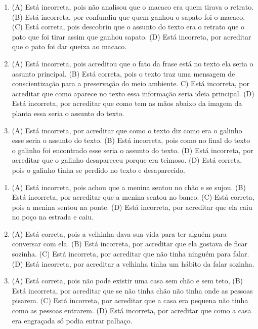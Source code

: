 
\begin{enumerate}
\item
(A) Está incorreta, pois não analisou que o macaco era quem tirava o retrato.
(B) Está incorreta, por confundiu que quem ganhou o sapato foi o macaco.
(C) Está correta, pois descobriu que o assunto do texto era o retrato
que o pato que foi tirar assim que ganhou sapato.
(D) Está incorreta, por acreditar que o pato foi dar queixa ao macaco.

\item
(A) Está incorreta, pois acreditou que o fato da frase está no texto ela
seria o assunto principal.
(B) Está correta, pois o texto traz uma mensagem de conscientização para
a preservação do meio ambiente.
C) Está incorreta, por acreditar que como aparece no texto essa
informação seria ideia principal.
(D) Está incorreta, por acreditar que como tem as mãos abaixo da imagem
da planta essa seria o assunto do texto.

\item
(A) Está incorreta, por acreditar que como o texto diz como era o
galinho esse seria o assunto do texto.
(B) Está incorreta, pois como no final do texto o galinho foi encontrado
esse seria o assunto do texto.
(D) Está incorreta, por acreditar que o galinho desapareceu porque era
teimoso.
(D) Está correta, pois o galinho tinha se perdido no texto e
desaparecido.
\end{enumerate}


\begin{enumerate}
\item
(A) Está incorreta, pois achou que a menina sentou no chão e se sujou.
(B) Está incorreta, por acreditar que a menina sentou no banco.
(C) Está correta, pois a menina sentou na ponte.
(D) Está incorreta, por acreditar que ela caiu no poço na estrada e caiu.

\item
(A) Está correta, pois a velhinha dava sua vida para ter alguém para conversar com ela.
(B) Está incorreta, por acreditar que ela gostava de ficar sozinha.
(C) Está incorreta, por acreditar que não tinha ninguém para falar.
(D) Está incorreta, por acreditar a velhinha tinha um hábito da falar sozinha.

\item
(A) Está correta, pois não pode existir uma casa sem chão e sem teto,
(B) Está incorreta, por acreditar que se não tinha chão não tinha onde
as pessoas pisarem.
(C) Está incorreta, por acreditar que a casa era pequena não tinha como
as pessoas entrarem.
(D) Está incorreta, por acreditar que como a casa era engraçada só podia
entrar palhaço.
\end{enumerate}

